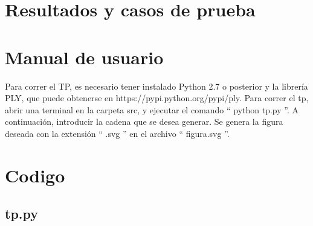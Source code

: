 \documentclass[a4paper, 10pt, twoside]{article}
\begin{document}
\section{Resultados y casos de prueba}


\section{Manual de usuario}
Para correr el TP, es necesario tener instalado Python 2.7 o posterior y la librería PLY, que puede obtenerse en https://pypi.python.org/pypi/ply. Para correr el tp, abrir una terminal en la carpeta src, y ejecutar el comando `` python tp.py ''. A continuación, introducir la cadena que se desea generar. Se genera la figura deseada con la extensión `` .svg '' en el archivo `` figura.svg ''.


\section{Codigo}


\subsection{tp.py}
%
\end{document}
